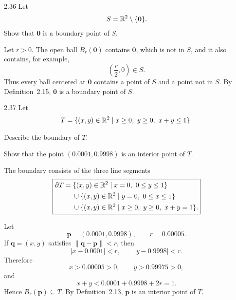 \documentclass[11pt,oneside]{article}
\begin{document}
\begin{problem}{2.36}
Let
\[
    S=\mathbb{R}^2\setminus\{\mathbf 0\}.
\]
Show that $\mathbf 0$ is a boundary point of $S$.
\end{problem}

\begin{solution}
Let $r>0$. The open ball $B_r(\mathbf 0)$ contains $\mathbf 0$, which is not in $S$, and it also contains, for example,
\[
    \left(\frac r2,0\right)\in S.
\]
Thus every ball centered at $\mathbf 0$ contains a point of $S$ and a point not in $S$. By Definition~2.15, $\mathbf 0$ is a boundary point of $S$.
\end{solution}

\begin{problem}{2.37}
Let
\[
    T=\{(x,y)\in\R^2\mid x\geq0,\ y\geq0,\ x+y\leq1\}.
\]
\begin{problemsubparts}
    \item Describe the boundary of $T$.
    \item Show that the point $(0.0001,0.9998)$ is an interior point of $T$.
\end{problemsubparts}
\end{problem}

\begin{solution}
\begin{problemsubparts}
    \item The boundary consists of the three line segments
    \[
        \boxed{
        \begin{aligned}
        \partial T
        ={}&\{(x,y)\in\mathbb{R}^2\mid x=0,\ 0\leq y\leq1\}\\
        &\cup\{(x,y)\in\mathbb{R}^2\mid y=0,\ 0\leq x\leq1\}\\
        &\cup\{(x,y)\in\mathbb{R}^2\mid x\geq0,\ y\geq0,\ x+y=1\}.
        \end{aligned}}
    \]

    \item Let
    \[
        \mathbf p=(0.0001,0.9998),
        \qquad
        r=0.00005.
    \]
    If $\mathbf q=(x,y)$ satisfies $\|\mathbf q-\mathbf p\|<r$, then
    \[
        |x-0.0001|<r,
        \qquad
        |y-0.9998|<r.
    \]
    Therefore
    \[
        x>0.00005>0,
        \qquad
        y>0.99975>0,
    \]
    and
    \[
        x+y
        <0.0001+0.9998+2r
        =1.
    \]
    Hence $B_r(\mathbf p)\subseteq T$. By Definition~2.13, $\mathbf p$ is an interior point of $T$.
\end{problemsubparts}
\end{solution}
\end{document}
